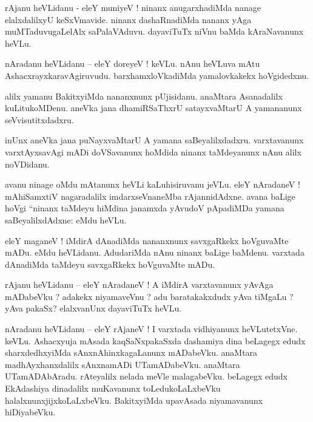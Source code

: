 \documentclass{article}
\begin{document}
\begin{mn}%
rAjanu heVLidanu - eleY muniyeV ! ninanx anugarxhadiMda nanage elalxdalilxyU keSxVmavide. ninanx 
dashaRnadiMda nananx yAga muMTaduvugaLelAlx saPalaVAduvu. dayaviTuTx niVnu baMda kAraNavanunx heVLu.
\end{mn}

\begin{mn}%
nAradanu heVLidanu -- eleY doreyeV ! keVLu. nAnu heVLuva mAtu AshacxrayxkaravAgiruvudu. 
barxhamxloVkadiMda yamalovkakekx hoVgidedxnu.
\end{mn}

\begin{mn}%
alilx yamanu BakitxyiMda nananxnunx pUjisidanu. anaMtara Asanadalilx kuLitukoMDenu. aneVka jana 
dhamiRSaThxrU satayxvaMtarU A yamananunx seVvisutitxdadxru.
\end{mn}

\begin{mn}%
inUnx aneVka jana puNayxvaMtarU A yamana saBeyalilxdadxru. varxtavanunx varxtAyxsavAgi mADi 
doVSavanunx hoMdida ninanx taMdeyanunx nAnu alilx noVDidanu.
\end{mn}

\begin{mn}%
avanu ninage oMdu mAtanunx heVLi kaLuhisiruvanu jeVLu. eleY nAradaneV ! mAhiSamxtiV nagaradalilx 
imdarxseVnaneMba rAjannidAdxne. avana baLige hoVgi ``ninanx taMdeyu hiMdina janamxda yAvudoV 
pApadiMDa yamana saBeyalilxdAdxne: eMdu heVLu.
\end{mn}

\begin{mn}%
eleY maganeV ! iMdirA dAnadiMda nananxnunx savxgaRkekx hoVguvaMte mADu. eMdu heVLidanu. AdudariMda 
nAnu ninanx baLige baMdenu. varxtada dAnadiMda taMdeyu savxgaRkekx hoVguvaMte mADu.
\end{mn}

\begin{mn}%
rAjanu heVLidanu -- eleY nAradaneV ! A iMdirA varxtavanunx yAvAga mADabeVku ? adakekx niyamaveVnu ? 
adu baratakakxdudx yAva tiMgaLu ? yAva pakaSx? elalxvanUnx dayaviTuTx heVLu.
\end{mn}

\begin{mn}%
nAradanu heVLidanu -- eleY rAjaneV ! I varxtada vidhiyanunx heVLutetxVne. keVLu. Ashacxyuja mAsada 
kaqSaNxpakaSxda dashamiya dina beLagegx edudx sharxdedhxyiMda sAnxnAhinxkagaLanunx mADabeVku. 
anaMtara madhAyxhanxdalilx sAnxnamADi UTamADabeVku. anaMtara UTamADAbAradu. rAteyalilx nelada 
meVle malagabeVku. beLagegx edudx EkAdashiya dinadalilx muKavanunx toLedukoLaLxbeVku 
halalxnunxjijxkoLaLxbeVku. BakitxyiMda upavAsada niyamavanunx hiDiyabeVku.
\end{mn}
\end{document}
